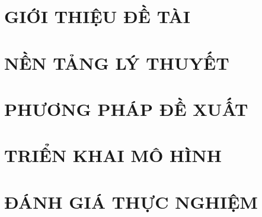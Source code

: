 \documentclass[a4paper,13pt,3p,twoside]{report}
\theoremstyle{definition}
\begin{document}


\renewcommand\appendixname{PHỤ LỤC}
\renewcommand\appendixpagename{PHỤ LỤC}
\renewcommand\appendixtocname{PHỤ LỤC}


\newpage
{}

\pagestyle{fancy}
\fancyhf{}
\fancyhead[RE, LO]{\leftmark}
\fancyfoot[RE, LO]{\thepage}

\chapter{GIỚI THIỆU ĐỀ TÀI}

\newpage
\chapter{NỀN TẢNG LÝ THUYẾT}


\newpage
\chapter{PHƯƠNG PHÁP ĐỀ XUẤT}


\newpage
\chapter{TRIỂN KHAI MÔ HÌNH}


\newpage
\chapter{ĐÁNH GIÁ THỰC NGHIỆM}

\end{document}
